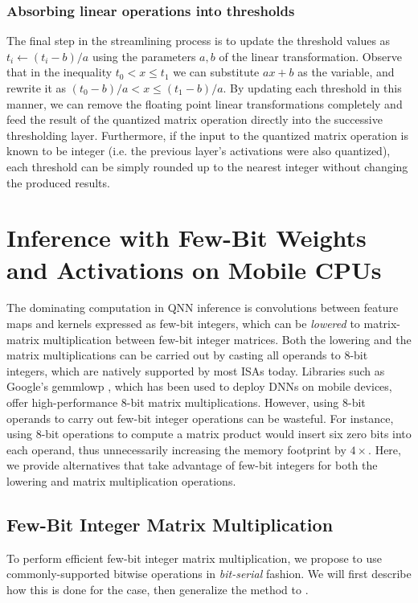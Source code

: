 \documentclass[sigconf]{acmart}
\begin{document}
\subsubsection{Absorbing linear operations into thresholds}
The final step in the streamlining process is to update the threshold values as $t_i \gets (t_i - b) / a$ using the parameters $a, b$ of the linear transformation.
Observe that in the inequality $t_0 < x \leq t_1$ we can substitute $ax+b$ as the variable, and rewrite it as $(t_0 - b) / a < x \leq (t_1 - b) / a$.
By updating each threshold in this manner, we can remove the floating point linear transformations completely and feed the result of the quantized matrix operation directly into the successive thresholding layer.
Furthermore, if the input to the quantized matrix operation is known to be integer (i.e. the previous layer's activations were also quantized), each threshold can be simply rounded up to the nearest integer without changing the produced results.

\section{Inference with Few-Bit Weights and Activations on Mobile CPUs}
The dominating computation in QNN inference is convolutions between feature maps and kernels expressed as few-bit integers, which can be \emph{lowered} \cite{convlowering} to matrix-matrix multiplication between few-bit integer matrices.
Both the lowering and the matrix multiplications can be carried out by casting all operands to 8-bit integers, which are natively supported by most ISAs today.
Libraries such as Google's gemmlowp \cite{gemmlowp}, which has been used to deploy DNNs on mobile devices, offer high-performance 8-bit matrix multiplications.
However, using 8-bit operands to carry out few-bit integer operations can be wasteful.
For instance, using 8-bit operations to compute a  matrix product would insert six zero bits into each operand, thus unnecessarily increasing the memory footprint by $4\times$. 
Here, we provide alternatives that take advantage of few-bit integers for both the lowering and matrix multiplication operations.

\subsection{Few-Bit Integer Matrix Multiplication}
\label{sec:fewbitgemm}
To perform efficient few-bit integer matrix multiplication, we propose to use commonly-supported bitwise operations in \emph{bit-serial} fashion.
We will first describe how this is done for the  case, then generalize the method to .
\end{document}
